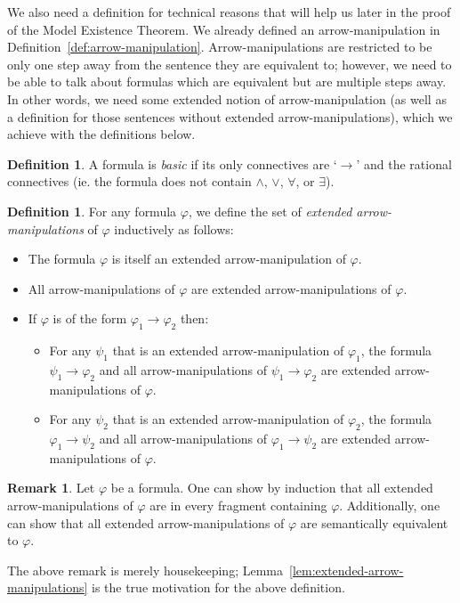 \documentclass{amsart}
\theoremstyle{definition}
\newtheorem{remark}[theorem]{Remark}
\newtheorem{definition}[theorem]{Definition}
\numberwithin{equation}{theorem}
\renewcommand{\phi}{\varphi}
\newcommand{\unvee}{{\vee}}
\newcommand{\unwedge}{{\wedge}}
\newcommand{\narrow}[1]{\xrightarrow{#1}}
\renewcommand{\to}{\narrow{}}
\begin{document}
We also need a definition for technical reasons that will help us later in the proof of the Model Existence Theorem.
We already defined an arrow-manipulation in Definition~\ref{def:arrow-manipulation}.
Arrow-manipulations are restricted to be only one step away from the sentence they are equivalent to; however, we need to be able to talk about formulas which are equivalent but are multiple steps away.
In other words, we need some extended notion of arrow-manipulation (as well as a definition for those sentences without extended arrow-manipulations), which we achieve with the definitions below.
\begin{definition}
  A formula is \emph{basic} if its only connectives are `$\to$' and the rational connectives (ie. the formula does not contain $\unwedge$, $\unvee$, $\forall$, or $\exists$).
\end{definition}
\begin{definition}
	For any formula $\phi$, we define the set of \emph{extended arrow-manipulations} of $\phi$ inductively as follows:
  \begin{itemize}
    \item The formula $\phi$ is itself an extended arrow-manipulation of $\phi$.
    \item All arrow-manipulations of $\phi$ are extended arrow-manipulations of $\phi$.
    \item If $\phi$ is of the form $\phi_1\to\phi_2$ then:
    \begin{itemize}
      \item 
        For any $\psi_1$ that is an extended arrow-manipulation of $\phi_1$, the formula $\psi_1\to\phi_2$ and all arrow-manipulations of $\psi_1\to\phi_2$ are extended arrow-manipulations of $\phi$.
      \item 
        For any $\psi_2$ that is an extended arrow-manipulation of $\phi_2$, the formula $\phi_1\to\psi_2$ and all arrow-manipulations of $\phi_1\to\psi_2$ are extended arrow-manipulations of $\phi$.
    \end{itemize}
  \end{itemize}
\end{definition}
\begin{remark}
  Let $\phi$ be a formula.
  One can show by induction that all extended arrow-manipulations of $\phi$ are in every fragment containing $\phi$.
  Additionally, one can show that all extended arrow-manipulations of $\phi$ are semantically equivalent to $\phi$.
\end{remark}
The above remark is merely housekeeping; Lemma~\ref{lem:extended-arrow-manipulations} is the true motivation for the above definition.
\end{document}
